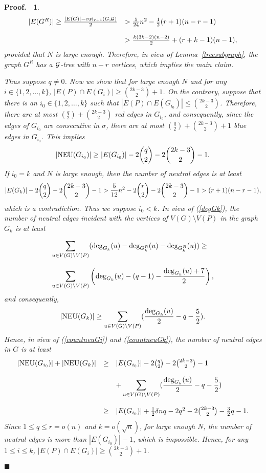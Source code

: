 \documentclass[11pt]{article}
\newtheorem{preproof}{{\bf Proof.\ }}
\newenvironment{proof}[1]{\begin{preproof}{\rm
               #1}\hfill{$\blacksquare$}}{\end{preproof}}
\begin{document}
\begin{proof}
{$$
\begin{array}{ll}
|E(G^R)|\geq {|E(G)|-{\rm cut}_{r+1}(G,{\cal G})\over 2} &> {5\over 24}n^2-{1\over 2}(r+1)(n-r-1)\\
&\\
& > {k(3k-2)(n-2)\over 2}+ (r+k-1)(n-1), 
\end{array}
$$
provided that $N$ is large enough.
Therefore, in view of Lemma~\ref{treesubgraph}, the graph $G^R$ has a ${\cal G}$-tree with $n-r$ vertices, which implies the main claim. 

Thus suppose $q\not = 0$.  
Now we show that for large enough $N$ and for any $i\in\{1,2,\ldots,k\}$, $|E(P)\cap E(G_i)|\geq {2k-3\choose 2}+1$.
On the contrary, suppose that there is an $i_0\in\{1,2,\ldots,k\}$ such that $|E(P)\cap E(G_{i_0})|\leq {2k-3\choose 2}$. 
Therefore, there are at most ${q\choose 2}+{2k-3\choose 2}$ red edges in $G_{i_0}$, and consequently, since the edges of $G_{i_0}$ are consecutive in $\sigma$, there are 
at most ${q\choose 2}+{2k-3\choose 2}+1$ blue edges in $G_{i_0}$. 
This implies 
\begin{equation}\label{countneuGi}
|{\rm NEU}(G_{i_0})| \geq |E(G_{i_0})|- 2{q\choose 2}-2{2k-3\choose 2}-1.
\end{equation}
If $i_0=k$ and $N$ is large enough, then the number of neutral edges is at least 
$$|E(G_{k})|- 2{q\choose 2}-2{2k-3\choose 2}-1>{5\over 12}n^2-2{r\choose 2}-2{2k-3\choose 2}-1> (r+1)(n-r-1),$$ 
which is a contradiction. 
Thus we suppose $i_0<k$.  In view of (\ref{degGk}), 
the number of neutral edges incident with the vertices of $V(G)\setminus V(P)$ in the graph $G_k$
is at least 

$$
\begin{array}{l}
\displaystyle\sum_{u\in V(G)\setminus V(P)} ({\rm deg}_{G_k}(u)-{\rm deg}_{G_k^R}(u)-{\rm deg}_{G_k^B}(u)) \geq \\
\\
\displaystyle\sum_{u\in V(G)\setminus V(P)} \left({\rm deg}_{G_k}(u)-(q-1)-{{\rm deg}_{G_k}(u)+7\over 2}\right),
\end{array}$$ 
and consequently,
\begin{equation}\label{countneuGk}
|{\rm NEU}(G_k)| \geq \displaystyle\sum_{u\in V(G)\setminus V(P)} ({{\rm deg}_{G_k}(u)\over 2}-q-{5\over 2}). 
\end{equation}
Hence, in view of (\ref{countneuGi}) and (\ref{countneuGk}), the number of neutral edges in $G$ is at least 
$$
\begin{array}{lcl}
|{\rm NEU}(G_{i_0})|+|{\rm NEU}(G_k)| & \geq & |E(G_{i_0})|- 2{q\choose 2}-2{2k-3\choose 2}-1\\
&& \\
&& +\displaystyle\sum_{u\in V(G)\setminus V(P)} ({{\rm deg}_{G_k}(u)\over 2}-q-{5\over 2})\\
&& \\
&\geq & |E(G_{i_0})|+ {1\over 2} \delta nq-2q^2-2{2k-3\choose 2}-{3\over 2}q-1. 
\end{array}$$ 
Since $1\leq q\leq r=o(n)$ and $k=o(\sqrt{n})$, for large enough $N$, the number of neutral edges is more than 
$|E(G_{i_0})|-1$, which is impossible. Hence, for any $1\leq i\leq k$, $|E(P)\cap E(G_i)|\geq {2k-3\choose 2}+1$.  

}
\end{proof}
\end{document}
